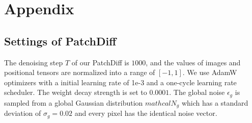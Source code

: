 % 
\onecolumn
\section{Appendix}

\subsection{Settings of PatchDiff}
The denoising step $T$ of our PatchDiff is $1000$, and the values of images and positional tensors are normalized into a range of $[-1, 1]$. We use AdamW optimizers with a initial learning rate of 1e-3 and a one-cycle learning rate scheduler. The weight decay strength is set to $0.0001$. The global noise $\epsilon_g$ is sampled from a global Gaussian distribution $mathcal{N}_g$ which has a standard deviation of $\sigma_g=0.02$ and every pixel has the identical noise vector. 


